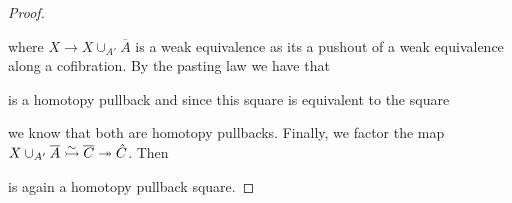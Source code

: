 \begin{prop}
\begin{proof}
\begin{center}
\begin{tikzcd} [sep = 4em]
            \end{tikzcd}
        \end{center}
        where $X\to X\cup_{A'}\overline{A}$ is a weak equivalence as its a pushout of a weak equivalence along a cofibration.
        By the pasting law we have that
        \begin{center}
        \end{center}
        is a homotopy pullback and since this square is equivalent to the square
        \begin{center}
        \end{center}
        we know that both are homotopy pullbacks.
        Finally, we factor the map $X\cup_{A'}\overline{A}\xtailrightarrow[]{\sim}\overline{C}\xtwoheadrightarrow{}\hat{C}$.
        Then 
        \begin{center}
        \end{center}
        is again a homotopy pullback square. %


\end{proof}
\end{prop}
